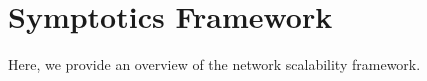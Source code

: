 
\section{Symptotics Framework}
\label{sec:symptotics_bckgrnd}

Here, we provide an overview of the network scalability framework.

